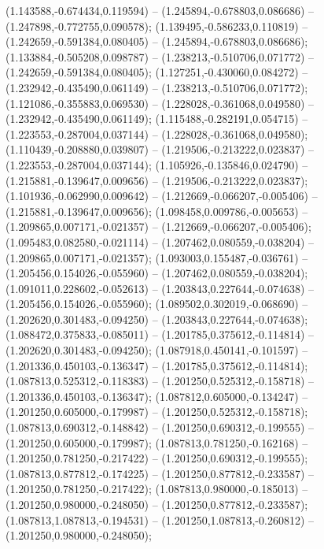  (1.143588,-0.674434,0.119594) -- (1.245894,-0.678803,0.086686) -- (1.247898,-0.772755,0.090578);
 (1.139495,-0.586233,0.110819) -- (1.242659,-0.591384,0.080405) -- (1.245894,-0.678803,0.086686);
 (1.133884,-0.505208,0.098787) -- (1.238213,-0.510706,0.071772) -- (1.242659,-0.591384,0.080405);
 (1.127251,-0.430060,0.084272) -- (1.232942,-0.435490,0.061149) -- (1.238213,-0.510706,0.071772);
 (1.121086,-0.355883,0.069530) -- (1.228028,-0.361068,0.049580) -- (1.232942,-0.435490,0.061149);
 (1.115488,-0.282191,0.054715) -- (1.223553,-0.287004,0.037144) -- (1.228028,-0.361068,0.049580);
 (1.110439,-0.208880,0.039807) -- (1.219506,-0.213222,0.023837) -- (1.223553,-0.287004,0.037144);
 (1.105926,-0.135846,0.024790) -- (1.215881,-0.139647,0.009656) -- (1.219506,-0.213222,0.023837);
 (1.101936,-0.062990,0.009642) -- (1.212669,-0.066207,-0.005406) -- (1.215881,-0.139647,0.009656);
 (1.098458,0.009786,-0.005653) -- (1.209865,0.007171,-0.021357) -- (1.212669,-0.066207,-0.005406);
 (1.095483,0.082580,-0.021114) -- (1.207462,0.080559,-0.038204) -- (1.209865,0.007171,-0.021357);
 (1.093003,0.155487,-0.036761) -- (1.205456,0.154026,-0.055960) -- (1.207462,0.080559,-0.038204);
 (1.091011,0.228602,-0.052613) -- (1.203843,0.227644,-0.074638) -- (1.205456,0.154026,-0.055960);
 (1.089502,0.302019,-0.068690) -- (1.202620,0.301483,-0.094250) -- (1.203843,0.227644,-0.074638);
 (1.088472,0.375833,-0.085011) -- (1.201785,0.375612,-0.114814) -- (1.202620,0.301483,-0.094250);
 (1.087918,0.450141,-0.101597) -- (1.201336,0.450103,-0.136347) -- (1.201785,0.375612,-0.114814);
 (1.087813,0.525312,-0.118383) -- (1.201250,0.525312,-0.158718) -- (1.201336,0.450103,-0.136347);
 (1.087812,0.605000,-0.134247) -- (1.201250,0.605000,-0.179987) -- (1.201250,0.525312,-0.158718);
 (1.087813,0.690312,-0.148842) -- (1.201250,0.690312,-0.199555) -- (1.201250,0.605000,-0.179987);
 (1.087813,0.781250,-0.162168) -- (1.201250,0.781250,-0.217422) -- (1.201250,0.690312,-0.199555);
 (1.087813,0.877812,-0.174225) -- (1.201250,0.877812,-0.233587) -- (1.201250,0.781250,-0.217422);
 (1.087813,0.980000,-0.185013) -- (1.201250,0.980000,-0.248050) -- (1.201250,0.877812,-0.233587);
 (1.087813,1.087813,-0.194531) -- (1.201250,1.087813,-0.260812) -- (1.201250,0.980000,-0.248050);
